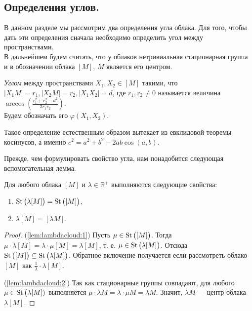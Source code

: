 \subsection{Определения углов.}
В данном разделе мы рассмотрим два определения угла облака. Для того, чтобы
дать эти определения сначала необходимо определить угол между пространствами.
\\
В дальнейшем будем считать, что у облаков нетривиальная стационарная группа и в
обозначении облака $ [M] $, $ M $ является его центром.
\begin{definition}
  \emph{Углом} между пространствами $ X_1, X_2 \in [M] $ такими, что $ |X_1
  M| = r_1, | X_2 M | =r_2, |X_1 X_2| = d$, где $ r_1,
  r_2 \neq 0 $ называется величина $ \arccos \left(\frac{r_1^2 +
  r_{2}^2 - d^2}{2r_1r_2} \right)$.\\ Будем обозначать его $
  \varphi(X_1, X_2) $.
\end{definition}
\begin{remark}
  Такое определение естественным образом вытекает из евклидовой теоремы
  косинусов, а именно $ c^{2} = a^2 + b^2 - 2ab\cos (a,b) $.
\end{remark}
Прежде, чем формулировать свойство угла, нам понадобится следующая
вспомогательная лемма.
\begin{lemma}
  \label{lem:lambdacloud} Для любого облака \( [M] \) и \( \lambda
  \in\mathbb{R}^+ \) выполняются следующие свойства{\textup{:}}
  \begin{enumerate}
    \item \( \operatorname{St}\big(\lambda [M]\big) = \operatorname{St}\big([M]\big)\),
      \label{lem:lambdacloud:1}
    \item \( \lambda [M] = [\lambda M] \).\label{lem:lambdacloud:2}
  \end{enumerate}
\end{lemma}
\begin{proof}
  (\ref{lem:lambdacloud:1}) Пусть \( \mu \in \operatorname{St}\big([M]\big) \). Тогда \( \mu
  \cdot \lambda [M] = \lambda \cdot \mu [M]= \lambda [M] \), т. е. \( \mu \in
  \operatorname{St}\big(\lambda [M]\big) \). Отсюда \( \operatorname{St}\big([M]\big) \subseteq
  \operatorname{St}\big(\lambda [M]\big) \). Обратное включение получается если рассмотреть
  облако \( [M] \) как \(\frac{1}{\lambda}\cdot \lambda [M] \).

  (\ref{lem:lambdacloud:2}) Так как стационарные группы совпадают, для любого
  \( \mu \in  \operatorname{St}\big(\lambda [M])\) выполняется \( \mu \cdot \lambda M =
  \lambda \cdot \mu M = \lambda M \). Значит, \( \lambda M \) --- центр
  облака \( \lambda [M] \).
\end{proof}
